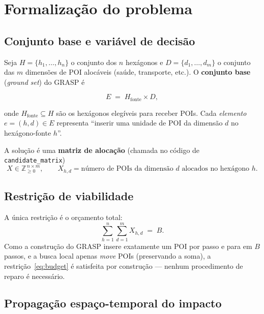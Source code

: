 \documentclass[11pt,a4paper]{article}
\begin{document}
\section{Formalização do problema}
\label{sec:problema}

\subsection{Conjunto base e variável de decisão}

Seja $H=\{h_1,\dots,h_n\}$ o conjunto dos $n$ hexágonos e
$D=\{d_1,\dots,d_m\}$ o conjunto das $m$ dimensões de POI alocáveis (saúde,
transporte, etc.). O \textbf{conjunto base} (\emph{ground set}) do GRASP é

\begin{equation}
E \;=\; H_{\text{fonte}} \times D,
\end{equation}

\noindent
onde $H_{\text{fonte}}\subseteq H$ são os hexágonos elegíveis para receber POIs.
Cada \emph{elemento} $e=(h,d)\in E$ representa ``inserir uma unidade de POI da
dimensão $d$ no hexágono-fonte $h$''.

A solução é uma \textbf{matriz de alocação} (chamada no código de
\texttt{candidate\_matrix})
\begin{equation}
X \in \mathbb{Z}_{\ge 0}^{\,n \times m},
\qquad
X_{h,d} = \text{número de POIs da dimensão } d \text{ alocados no hexágono } h .
\end{equation}

\subsection{Restrição de viabilidade}

A única restrição é o orçamento total:
\begin{equation}
\sum_{h=1}^{n}\sum_{d=1}^{m} X_{h,d} \;=\; B .
\label{eq:budget}
\end{equation}
Como a construção do GRASP insere exatamente um POI por passo e para em $B$
passos, e a busca local apenas \emph{move} POIs (preservando a soma), a
restrição~\eqref{eq:budget} é satisfeita por construção --- nenhum procedimento
de reparo é necessário.

\subsection{Propagação espaço-temporal do impacto}
\end{document}
